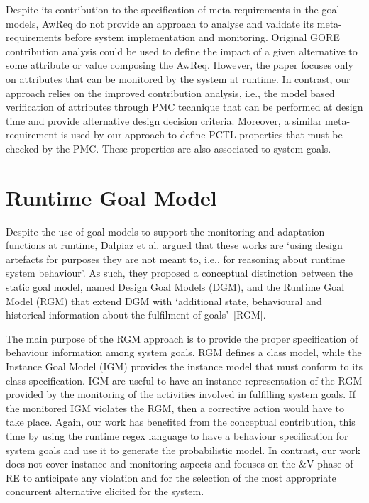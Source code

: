 Despite its contribution to the specification of meta-requirements in the goal models, AwReq do not provide an approach to analyse and validate its meta-requirements before system implementation and monitoring. Original GORE contribution analysis could be used to define the impact of a given alternative to some attribute or value composing the AwReq. However, the paper focuses only on attributes that can be monitored by the system at runtime. In contrast, our approach relies on the improved contribution analysis, i.e., the model based verification of attributes through PMC technique that can be performed at design time and provide alternative design decision criteria. Moreover, a similar meta-requirement is used by our approach to define PCTL properties that must be checked by the PMC. These properties are also associated to system goals.

\section{Runtime Goal Model}

Despite the use of goal models to support the monitoring and adaptation functions at runtime, Dalpiaz et al. argued that these works are `using design artefacts for purposes they are not meant to, i.e., for reasoning about runtime system behaviour'. As such, they proposed a conceptual distinction between the static goal model, named Design Goal Models (DGM), and the Runtime Goal Model (RGM) that extend DGM with `additional state, behavioural and historical information about the fulfilment of goals'~[RGM].

The main purpose of the RGM approach is to provide the proper specification of behaviour information among system goals. RGM defines a class model, while the Instance Goal Model (IGM) provides the instance model that must conform to its class specification. IGM are useful to have an instance representation of the RGM provided by the monitoring of the activities involved in fulfilling system goals. If the monitored IGM violates the RGM, then a corrective action would have to take place. Again, our work has benefited from the conceptual contribution, this time by using the runtime regex language to have a behaviour specification for system goals and use it to generate the probabilistic model. In contrast, our work does not cover instance and monitoring aspects and focuses on the \&V phase of RE to anticipate any violation and for the selection of the most appropriate concurrent alternative elicited for the system.

